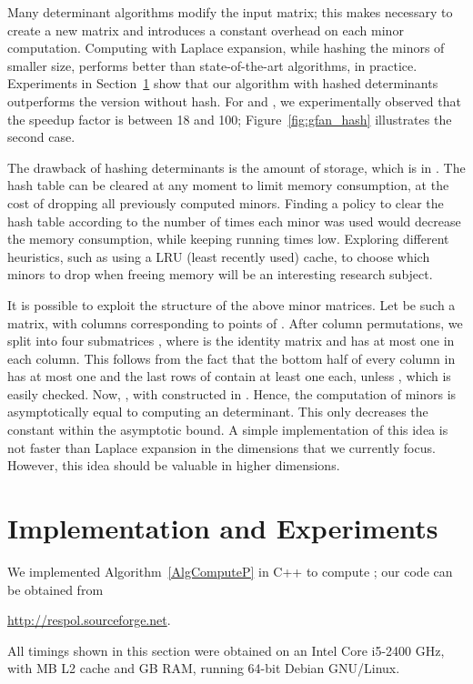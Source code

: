 \documentclass{article}
\begin{document}
Many determinant algorithms modify the input matrix;
this makes necessary to create a new matrix and introduces a constant
overhead on each minor computation.
Computing with Laplace expansion, while
hashing the minors of smaller size, performs better than
state-of-the-art algorithms, in practice.
Experiments in Section~\ref{Simplement} show that our algorithm with hashed
determinants outperforms the version without hash.
For  and , we experimentally observed that the speedup factor
is between 18 and 100; Figure~\ref{fig:gfan_hash} illustrates the second case.

The drawback of hashing determinants is the amount of storage, which 
is in .
The hash table can be cleared at any moment to limit memory consumption, at
the cost of dropping all previously computed minors. Finding a policy
to clear the hash table according to the number of times each minor was
used would decrease the memory consumption, while keeping running times
low.
Exploring different heuristics, such as using a LRU (least recently used)
cache, to choose which minors to drop when freeing memory will be an
interesting research subject.

It is possible to exploit the structure of the above  minor
matrices. Let  be such a matrix, with
columns corresponding to points of .
After column permutations, we split  into four 
submatrices , where  is the identity matrix 
and  has at most one  in each column.
This follows from the fact that the bottom half of every column in 
has at most one  and the last  rows of  contain at least
one  each, unless , which is easily checked.
Now, , with  constructed in .
Hence, the computation of  minors
is asymptotically equal to computing 
an  determinant. 
This only decreases the constant within the asymptotic bound.
A simple implementation of this idea is not faster than Laplace expansion in
the dimensions that we currently focus.  However, this idea should be valuable
in higher dimensions.


\section{Implementation and Experiments} \label{Simplement}

We implemented Algorithm~\ref{AlgComputeP} in C++ to compute ; our code
can be obtained from 
\begin{center}
 \url{http://respol.sourceforge.net}. 
\end{center}
All timings shown in this section were obtained on an Intel Core i5-2400
GHz, with MB L2 cache and GB RAM, running 64-bit Debian
GNU/Linux.
\end{document}
